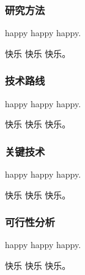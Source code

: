 
\justifying

\subsubsection{研究方法}

\indent\setlength{\parindent}{2em}%

happy happy happy.

快乐 快乐 快乐。

\subsubsection{技术路线}

\indent\setlength{\parindent}{2em}%

happy happy happy.

快乐 快乐 快乐。


\subsubsection{关键技术}

\indent\setlength{\parindent}{2em}%

happy happy happy.

快乐 快乐 快乐。

\subsubsection{可行性分析}

\indent\setlength{\parindent}{2em}%

happy happy happy.

快乐 快乐 快乐。

\clearpage
